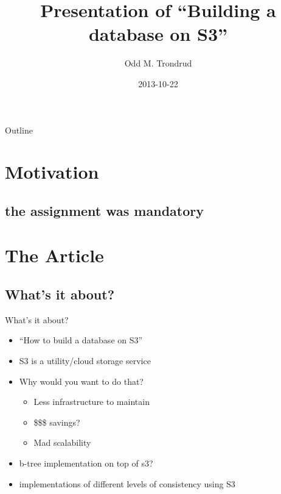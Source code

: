 \documentclass{beamer}
\title[Building a database on S3] %
{Presentation of ``Building a database on S3''}
\author[Odd M. Trondrud]{Odd M. Trondrud}
\institute[Norwegian University of Technology and Science] 
{
  Presentation of seminar article\\
  TDT4150 ``Avanserte Databasesystemer''\\
  autumn semester of 2013\\
  NTNU
}
\date[]
{2013-10-22}
\begin{document}
\begin{frame}
  \titlepage
\end{frame}

\begin{frame}{Outline}
  \tableofcontents
\end{frame}



\section{Motivation}

\subsection{the assignment was mandatory}

\section{The Article}
  \subsection{What's it about?}
    \begin{frame}{What's it about?}
      \begin{itemize}
      \item
        ``How to build a database on S3''
      \item
        S3 is a utility/cloud storage service
      \item
        Why would you want to do that?
        \begin{itemize}
        \item
          Less infrastructure to maintain
        \item
          \$\$\$ savings?
        \item
          Mad scalability
        \end{itemize}
      \item
        b-tree implementation on top of s3?
      \item
        implementations of different levels of consistency using S3
      \end{itemize}
    \end{frame}
\end{document}
